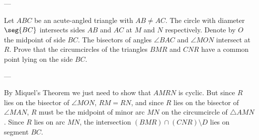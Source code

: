 
---

Let $ABC$ be an acute-angled triangle with $AB\ne AC$. The circle with diameter $\seg{BC}$ intersects sides $AB$ and $AC$ at $M$ and $N$ respectively. Denote by $O$ the midpoint of side $BC$. The bisectors of angles $\angle BAC$ and $\angle MON$ intersect at $R$. Prove that the circumcircles of the triangles $BMR$ and $CNR$ have a common point lying on the side $BC$.

---

By Miquel's Theorem we just need to show that $AMRN$ is cyclic. But since $R$ lies on the bisector of $\angle MON$, $RM=RN$, and since $R$ lies on the bisector of $\angle MAN$, $R$ must be the midpoint of minor arc $MN$ on the circumcircle of $\triangle AMN$. Since $R$ lies on arc $MN$, the intersection $(BMR)\cap(CNR)\setminus D$ lies on segment $BC$.
